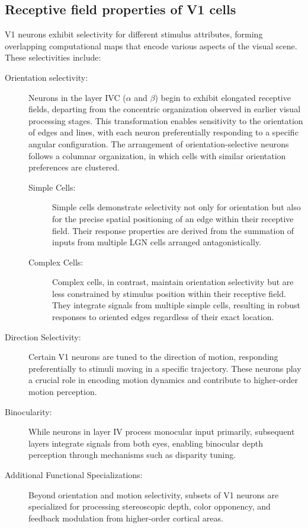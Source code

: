 \subsection{Receptive field properties of V1 cells}
\label{subsec:receptive_field}
V1 neurons exhibit selectivity for different stimulus attributes, forming
overlapping computational maps that encode various aspects of the visual scene. 
These selectivities include:

\begin{description}
    \item[Orientation selectivity:] Neurons in the layer IVC ($\alpha$ and $\beta$) begin to exhibit elongated receptive fields, departing from the concentric organization observed in earlier visual processing stages. This transformation enables sensitivity to the orientation of edges and lines, with each neuron preferentially responding to a specific angular configuration. The arrangement of orientation-selective neurons follows a columnar organization, in which cells with similar orientation preferences are clustered.
    \begin{description}
        \item[Simple Cells:] Simple cells demonstrate selectivity not only for orientation 
        but also for the precise spatial positioning of an edge within their receptive field. 
        Their response properties are derived from the summation of inputs from multiple LGN cells arranged antagonistically.
        \item[Complex Cells:] Complex cells, in contrast, maintain orientation selectivity but are less constrained by stimulus position within their receptive field. They 
        integrate signals from multiple simple cells, resulting in robust responses to oriented edges regardless of their exact location.
    \end{description}
    \item[Direction Selectivity:] Certain V1 neurons are tuned to the direction of motion, 
    responding preferentially to stimuli moving in a specific trajectory. These neurons play a crucial role in encoding motion dynamics and contribute to higher-order motion perception.
    \item[Binocularity:] While neurons in layer IV process monocular input primarily, subsequent layers integrate signals from both eyes, enabling binocular depth perception through mechanisms such as disparity tuning.
    \item[Additional Functional Specializations:] Beyond orientation and motion selectivity, 
    subsets of V1 neurons are specialized for processing stereoscopic depth, color opponency, 
    and feedback modulation from higher-order cortical areas.
\end{description}

